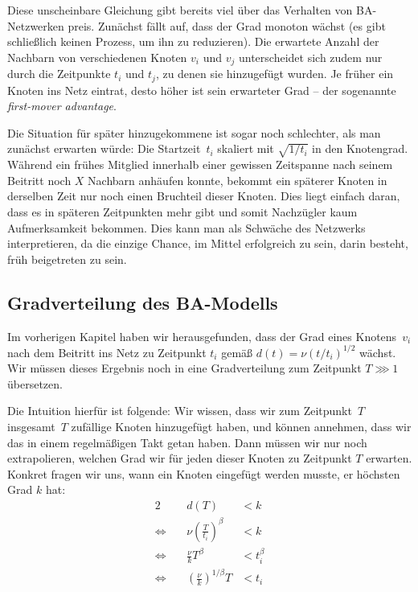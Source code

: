 Diese unscheinbare Gleichung gibt bereits viel über das Verhalten von BA-Netzwerken preis.
Zunächst fällt auf, dass der Grad monoton wächst (es gibt schließlich keinen Prozess, um ihn zu reduzieren).
Die erwartete Anzahl der Nachbarn von verschiedenen Knoten $v_i$ und $v_j$ unterscheidet sich zudem nur durch die Zeitpunkte $t_i$ und $t_j$, zu denen sie hinzugefügt wurden.
Je früher ein Knoten ins Netz eintrat, desto höher ist sein erwarteter Grad -- der sogenannte  \emph{first-mover advantage}.

Die Situation für später hinzugekommene ist sogar noch schlechter, als man zunächst erwarten würde:
Die Startzeit~$t_i$ skaliert mit $\sqrt{1 / t_i}$ in den Knotengrad.
Während ein frühes Mitglied innerhalb einer gewissen Zeitspanne nach seinem Beitritt noch $X$ Nachbarn anhäufen konnte, bekommt ein späterer Knoten in derselben Zeit nur noch einen Bruchteil dieser Knoten.
Dies liegt einfach daran, dass es in späteren Zeitpunkten mehr  gibt und somit Nachzügler kaum Aufmerksamkeit bekommen.
Dies kann man als Schwäche des Netzwerks interpretieren, da die einzige Chance, im Mittel erfolgreich zu sein, darin besteht, früh beigetreten zu sein.

\subsection{Gradverteilung des BA-Modells}
Im vorherigen Kapitel haben wir herausgefunden, dass der Grad eines Knotens~$v_i$ nach dem Beitritt ins Netz zu Zeitpunkt $t_i$ gemäß $d(t) = \nu (t  / t_i)^{1/2}$ wächst.
Wir müssen dieses Ergebnis noch in eine Gradverteilung zum Zeitpunkt $T \ggg 1$ übersetzen.

Die Intuition hierfür ist folgende:
Wir wissen, dass wir zum Zeitpunkt~$T$ insgesamt~$T$ zufällige Knoten hinzugefügt haben, und können annehmen, dass wir das in einem regelmäßigen Takt getan haben.
Dann müssen wir nur noch extrapolieren, welchen Grad wir für jeden dieser Knoten zu Zeitpunkt $T$ erwarten.
Konkret fragen wir uns, wann ein Knoten eingefügt werden musste, \sd er höchsten Grad $k$ hat:
\begin{alignat}{2}
                     &  & d(T)                                   & < k         \\
    \Leftrightarrow~ &  & \nu \left(\frac{T}{t_i}\right)^\beta   & < k         \\
    \Leftrightarrow~ &  & \frac{\nu}{k} T^\beta                  & < t_i^\beta \\
    \Leftrightarrow~ &  & \left(\frac{\nu}{k}\right)^{1/\beta} T & < t_i
\end{alignat}

